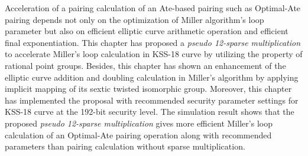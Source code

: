 Acceleration of a pairing calculation of an Ate-based pairing such as Optimal-Ate pairing depends not only on the optimization of Miller algorithm's loop parameter but also on efficient elliptic curve arithmetic operation and efficient final exponentiation. 
This chapter has proposed a \textit{pseudo 12-sparse multiplication} to accelerate Miller's loop calculation in KSS-18 curve by utilizing the property of rational point groups.
Besides, this chapter has shown an enhancement of the elliptic curve addition and doubling calculation in Miller's algorithm by applying implicit mapping of its sextic twisted isomorphic group. 
Moreover, this chapter has implemented the proposal with recommended security parameter settings for KSS-18 curve at the 192-bit security level.
The simulation result shows that the proposed \textit{pseudo 12-sparse multiplication} gives more efficient Miller's loop calculation of an Optimal-Ate pairing operation along with recommended parameters than pairing calculation without sparse multiplication.


